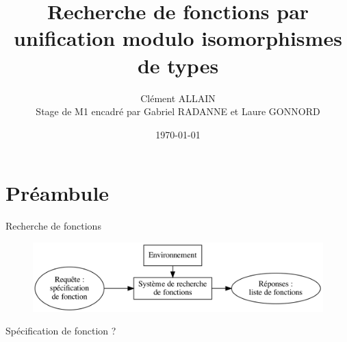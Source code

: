 \documentclass[serif]{beamer}
\title{Recherche de fonctions par \\ unification modulo isomorphismes de types}
\author{Clément ALLAIN \\ Stage de M1 encadré par Gabriel RADANNE et Laure GONNORD}
\date{\today}
\begin{document}

\begin{frame}
\titlepage
\end{frame}


\begin{frame}
\tableofcontents
\end{frame}


\section{Préambule}


\begin{frame}{Recherche de fonctions}
\begin{figure}[h]
  \centering
  \includegraphics[scale=0.2]{graphs/recherche_fonction}
\end{figure}
\centering
Spécification de fonction ?
\end{frame}

\end{document}
